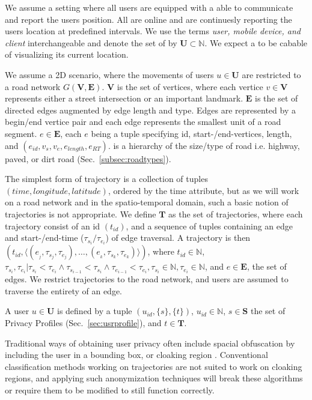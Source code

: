 We assume a setting where all users are equipped with a \md able to communicate and report
the users position. All  \mds are online and are continuesly reporting the users location at
predefined intervals. We use the terms {\it user, mobile device, and client} interchangeable and 
denote the set of \mds by  $\mathbf{U} \subset \mathbb{N}$. We expect a \md to be cabable of visualizing its current location.

We assume a 2D scenario, where the movements of users $u \in \mathbf{U}$ are restricted to a road network $G(\mathbf{V,E})$.
$\mathbf{V}$ is the set of vertices, where each vertice $v \in \mathbf{V}$ represents either a street intersection or an important landmark. $\mathbf{E}$ is the set of directed edges augmented by edge length and type. Edges are represented by a begin/end vertice pair and each edge represents the smallest unit of a road segment. $e \in \mathbf{E}$, each $e$ being a tuple specifying id, start-/end-vertices, length, and \rt $(e_{id},v_s,v_e,e_{length},e_{RT})$. \rt is a hierarchy of the size/type of road i.e. highway, paved, or dirt road (Sec.~\ref{subsec:roadtypes}).

The simplest form of trajectory is a collection of tuples $(time,longitude,latitude)$, ordered by the time attribute, but as we will work on a road network and in the spatio-temporal domain, such a basic notion of trajectories is not appropriate. 
We define $\mathbf{T}$ as the set of trajectories, where each trajectory consist of an id $(t_{id})$, and a sequence of tuples containing an edge and start-/end-time ($\tau_{s_i}/\tau_{e_i}$) of edge traversal. A trajectory is then  $(t_{id}, \langle (e_{_j},\tau_{s_j},\tau_{e_j}), \ldots,(e_{_k}, \tau_{s_k},\tau_{e_k}) \rangle)$, where $t_{id}  \in \mathbb{N}$, $\tau_{s_i},\tau_{e_i}  | \tau_{s_i} < \tau_{e_i} \wedge \tau_{s_{i-1}} < \tau_{s_{i}} \wedge \tau_{e_{i-1}} < \tau_{e_{i}}, \tau_{s_i} \in \mathbb{N}, \tau_{e_i} \in \mathbb{N}$, and $e \in \mathbf{E}$, the set of edges. We restrict trajectories to the road network, and users are assumed to traverse the entirety of an edge.

A user $u \in \mathbf{U}$ is defined by a tuple $(u_{id}, \{s\}, \{t\})$, $u_{id} \in \mathbb{N}$, $s \in \mathbf{S}$ the set of Privacy Profiles (Sec.~\ref{sec:usrprofile}), and $t \in \mathbf{T}$. 

Traditional ways of obtaining user privacy often include spacial obfuscation by including the user in a bounding box, or cloaking region \cite{trajecGeneral09, semantic08}. Conventional classification methods working on trajectories \cite{Li2007, outlier09, outlier08} are not suited to work on cloaking regions, and applying such anonymization techniques will break these algorithms or require them to be modified to still function correctly.

